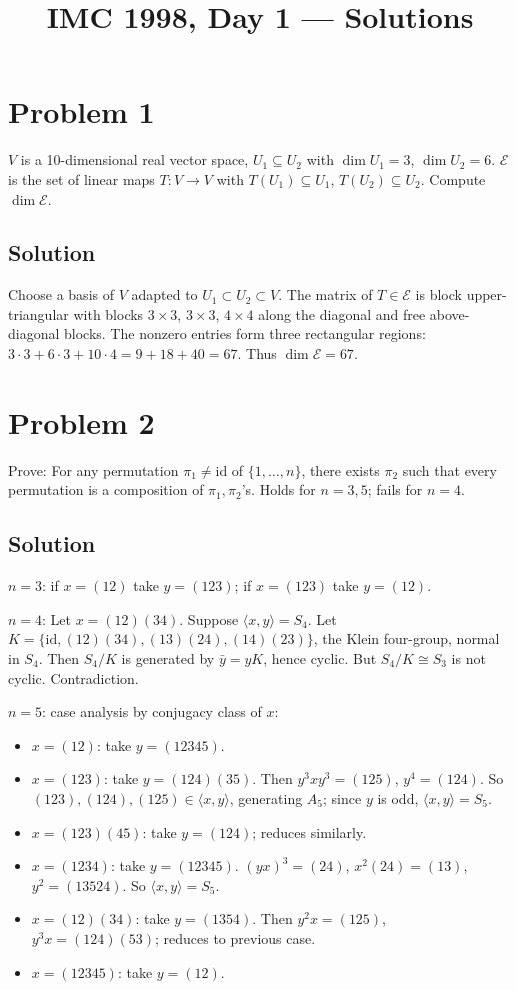 \documentclass{article}
\title{IMC 1998, Day 1 --- Solutions}
\begin{document}
\maketitle

\section*{Problem 1}
$V$ is a 10-dimensional real vector space, $U_1\subseteq U_2$ with $\dim U_1=3$, $\dim U_2=6$. $\mathcal E$ is the set of linear maps $T:V\to V$ with $T(U_1)\subseteq U_1$, $T(U_2)\subseteq U_2$. Compute $\dim\mathcal E$.

\subsection*{Solution}
Choose a basis of $V$ adapted to $U_1\subset U_2\subset V$. The matrix of $T\in\mathcal E$ is block upper-triangular with blocks $3\times 3$, $3\times 3$, $4\times 4$ along the diagonal and free above-diagonal blocks. The nonzero entries form three rectangular regions: $3\cdot 3 + 6\cdot 3 + 10\cdot 4 = 9 + 18 + 40 = 67$. Thus $\dim\mathcal E = 67$.

\section*{Problem 2}
Prove: For any permutation $\pi_1\ne \mathrm{id}$ of $\{1,\dots,n\}$, there exists $\pi_2$ such that every permutation is a composition of $\pi_1, \pi_2$'s. Holds for $n=3,5$; fails for $n=4$.

\subsection*{Solution}
$n=3$: if $x=(12)$ take $y=(123)$; if $x=(123)$ take $y=(12)$.

$n=4$: Let $x=(12)(34)$. Suppose $\langle x,y\rangle = S_4$. Let $K = \{\mathrm{id}, (12)(34), (13)(24), (14)(23)\}$, the Klein four-group, normal in $S_4$. Then $S_4/K$ is generated by $\bar y = yK$, hence cyclic. But $S_4/K\cong S_3$ is not cyclic. Contradiction.

$n=5$: case analysis by conjugacy class of $x$:
\begin{itemize}
\item $x=(12)$: take $y=(12345)$.
\item $x=(123)$: take $y=(124)(35)$. Then $y^3 x y^3 = (125)$, $y^4 = (124)$. So $(123),(124),(125)\in\langle x,y\rangle$, generating $A_5$; since $y$ is odd, $\langle x,y\rangle = S_5$.
\item $x=(123)(45)$: take $y=(124)$; reduces similarly.
\item $x=(1234)$: take $y=(12345)$. $(yx)^3 = (24)$, $x^2(24)=(13)$, $y^2=(13524)$. So $\langle x,y\rangle = S_5$.
\item $x=(12)(34)$: take $y=(1354)$. Then $y^2 x = (125)$, $y^3 x=(124)(53)$; reduces to previous case.
\item $x=(12345)$: take $y=(12)$.
\end{itemize}
\end{document}
